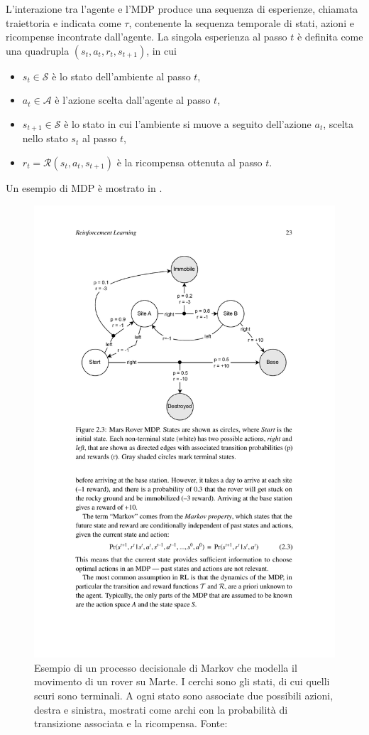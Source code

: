 L'interazione tra l'agente e l'MDP produce una sequenza di esperienze, chiamata traiettoria e indicata come $\tau$, contenente la sequenza temporale di stati, azioni e ricompense incontrate dall'agente. La singola esperienza al passo $t$ è definita come una quadrupla $(s_t, a_t, r_t, s_{t+1})$, in cui

\begin{itemize}
    \item $s_t \in \mathcal{S}$ è lo stato dell'ambiente al passo $t$,

    \item $a_t \in \mathcal{A}$ è l'azione scelta dall'agente al passo $t$,

    \item $s_{t+1} \in \mathcal{S}$ è lo stato in cui l'ambiente si muove a seguito dell'azione $a_t$, scelta nello stato $s_t$ al passo $t$,

    \item $r_t = \mathcal{R}(s_t, a_t, s_{t+1})$ è la ricompensa ottenuta al passo $t$. \label{sec:2_reward_function_def}
\end{itemize}

Un esempio di MDP è mostrato in .

\begin{figure}
    \centering
    \includegraphics[width=.6\linewidth]{assets/2/rl_mdp_example.pdf}
    \caption[Esempio di un processo decisionale di Markov]{Esempio di un processo decisionale di Markov che modella il movimento di un rover su Marte. I cerchi sono gli stati, di cui quelli scuri sono terminali. A ogni stato sono associate due possibili azioni, destra e sinistra, mostrati come archi con la probabilità di transizione associata e la ricompensa. Fonte: \cite{Stefano2024}}
    \label{fig:2_rl_mdp_example}
\end{figure}

